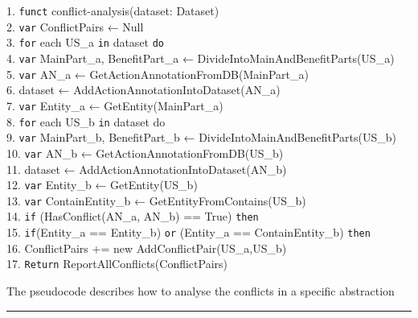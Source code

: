 \begin{MyListing}
\begin{flushleft}
	 1. \texttt{funct} conflict-analysis(dataset: Dataset)\\
	 2. \hspace{12pt}\texttt{var} ConflictPairs ← Null\\
	 3. \hspace{12pt}\texttt{for} each US\_a \texttt{in} dataset \texttt{do}	\\
	 4. \hspace{20pt}\texttt{var} MainPart\_a, BenefitPart\_a ← DivideIntoMainAndBenefitParts(US\_a)\\
	 5. \hspace{20pt}\texttt{var} AN\_a ← GetActionAnnotationFromDB(MainPart\_a)\\
	 6. \hspace{20pt}dataset  ← AddActionAnnotationIntoDataset(AN\_a)\\
	 7. \hspace{20pt}\texttt{var} Entity\_a ← GetEntity(MainPart\_a)\\
	 8. \hspace{20pt}\texttt{for} each US\_b \texttt{in} dataset do\\
	 9. \hspace{32pt}\texttt{var} MainPart\_b, BenefitPart\_b ←  DivideIntoMainAndBenefitParts(US\_b)\\
	 10. \hspace{26pt}\texttt{var} AN\_b ← GetActionAnnotationFromDB(US\_b)\\
	 11. \hspace{28pt}dataset  ← AddActionAnnotationIntoDataset(AN\_b)\\
	 12. \hspace{28pt}\texttt{var} Entity\_b ← GetEntity(US\_b)\\
	 13. \hspace{28pt}\texttt{var} ContainEntity\_b ←  GetEntityFromContains(US\_b)\\
	 14. \hspace{28pt}\texttt{if} (HasConflict(AN\_a, AN\_b) == True) \texttt{then}\\
	 15. \hspace{45pt}\texttt{if}(Entity\_a == Entity\_b) \texttt{or} (Entity\_a == ContainEntity\_b) \texttt{then}\\
	 16. \hspace{55pt}ConflictPairs += new AddConflictPair(US\_a,US\_b)\\
	 17. \hspace{6pt}\texttt{Return} ReportAllConflicts(ConflictPairs)\\
	

\end{flushleft}

\caption{The pseudocode describes how to analyse the conflicts in a specific abstraction}\label{list:conflict_pseudocode}

	\hrule

\end{MyListing}
